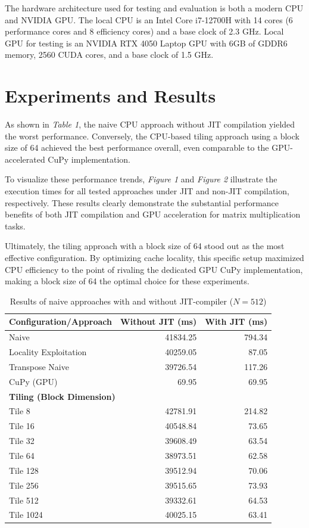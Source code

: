 \documentclass[11pt,a4paper]{article}
\begin{document}
The hardware architecture used for testing and evaluation is both a modern CPU and NVIDIA GPU. 
The local CPU is an Intel Core i7-12700H with 14 cores (6 performance cores and 8 efficiency cores) and a base clock of 2.3 GHz.
Local GPU for testing is an NVIDIA RTX 4050 Laptop GPU with 6GB of GDDR6 memory, 2560 CUDA cores, and a base clock of 1.5 GHz.




\section{Experiments and Results}
As shown in \textit{Table 1}, the naive CPU approach without JIT compilation yielded the worst performance. Conversely, the CPU-based tiling approach using a block size of 64 achieved the best performance overall, even comparable to the GPU-accelerated CuPy implementation.

To visualize these performance trends, \textit{Figure 1} and \textit{Figure 2} illustrate the execution times for all tested approaches under JIT and non-JIT compilation, respectively. These results clearly demonstrate the substantial performance benefits of both JIT compilation and GPU acceleration for matrix multiplication tasks.

Ultimately, the tiling approach with a block size of 64 stood out as the most effective configuration. By optimizing cache locality, this specific setup maximized CPU efficiency to the point of rivaling the dedicated GPU CuPy implementation, making a block size of 64 the optimal choice for these experiments.
\begin{table}[htbp]
\centering
\caption{Results of naive approaches with and without JIT-compiler ($N = 512$)}
\label{tab:matrix_mult_results_combined}
\begin{tabular}{lrr}
\toprule
\textbf{Configuration/Approach} & \textbf{Without JIT (ms)} & \textbf{With JIT (ms)} \\
\midrule
Naive                 & 41834.25 & 794.34  \\
Locality Exploitation & 40259.05 & 87.05  \\
Transpose Naive       & 39726.54 & 117.26 \\
CuPy (GPU)           & 69.95    & 69.95  \\
\midrule
\multicolumn{3}{l}{\textbf{Tiling (Block Dimension)}} \\
\quad Tile 8          & 42781.91 & 214.82 \\
\quad Tile 16         & 40548.84 & 73.65 \\
\quad Tile 32         & 39608.49 & 63.54 \\
\quad Tile 64         & 38973.51 & 62.58 \\
\quad Tile 128        & 39512.94 & 70.06 \\
\quad Tile 256        & 39515.65 & 73.93 \\
\quad Tile 512        & 39332.61 & 64.53 \\
\quad Tile 1024       & 40025.15 & 63.41 \\

\bottomrule

\end{tabular}
\end{table}
\end{document}
